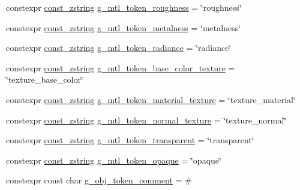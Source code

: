 \begin{DoxyCompactItemize}
constexpr \mbox{\hyperlink{namespacemage_abfd9206dc607ceb5d13ec68bf075a5c0}{const\+\_\+zstring}} \mbox{\hyperlink{namespacemage_1_1rendering_1_1loader_a2ec32e8ddd043f1989ca6b58ad964c32}{g\+\_\+mtl\+\_\+token\+\_\+roughness}} = \char`\"{}roughness\char`\"{}
\item 
constexpr \mbox{\hyperlink{namespacemage_abfd9206dc607ceb5d13ec68bf075a5c0}{const\+\_\+zstring}} \mbox{\hyperlink{namespacemage_1_1rendering_1_1loader_a17bfd9071437318629c792d38ca71808}{g\+\_\+mtl\+\_\+token\+\_\+metalness}} = \char`\"{}metalness\char`\"{}
\item 
constexpr \mbox{\hyperlink{namespacemage_abfd9206dc607ceb5d13ec68bf075a5c0}{const\+\_\+zstring}} \mbox{\hyperlink{namespacemage_1_1rendering_1_1loader_a5abd3a154bef9be04f7649447c50164a}{g\+\_\+mtl\+\_\+token\+\_\+radiance}} = \char`\"{}radiance\char`\"{}
\item 
constexpr \mbox{\hyperlink{namespacemage_abfd9206dc607ceb5d13ec68bf075a5c0}{const\+\_\+zstring}} \mbox{\hyperlink{namespacemage_1_1rendering_1_1loader_aa3dfb00f93883473d1ff397f0079364e}{g\+\_\+mtl\+\_\+token\+\_\+base\+\_\+color\+\_\+texture}} = \char`\"{}texture\+\_\+base\+\_\+color\char`\"{}
\item 
constexpr \mbox{\hyperlink{namespacemage_abfd9206dc607ceb5d13ec68bf075a5c0}{const\+\_\+zstring}} \mbox{\hyperlink{namespacemage_1_1rendering_1_1loader_a0bd068f0f246c00b56412b1bd7f70ed4}{g\+\_\+mtl\+\_\+token\+\_\+material\+\_\+texture}} = \char`\"{}texture\+\_\+material\char`\"{}
\item 
constexpr \mbox{\hyperlink{namespacemage_abfd9206dc607ceb5d13ec68bf075a5c0}{const\+\_\+zstring}} \mbox{\hyperlink{namespacemage_1_1rendering_1_1loader_afa917f0393f16f0fec40ad5d85aa65f9}{g\+\_\+mtl\+\_\+token\+\_\+normal\+\_\+texture}} = \char`\"{}texture\+\_\+normal\char`\"{}
\item 
constexpr \mbox{\hyperlink{namespacemage_abfd9206dc607ceb5d13ec68bf075a5c0}{const\+\_\+zstring}} \mbox{\hyperlink{namespacemage_1_1rendering_1_1loader_a2e86bdf00ab5d9721684b02b575a9df7}{g\+\_\+mtl\+\_\+token\+\_\+transparent}} = \char`\"{}transparent\char`\"{}
\item 
constexpr \mbox{\hyperlink{namespacemage_abfd9206dc607ceb5d13ec68bf075a5c0}{const\+\_\+zstring}} \mbox{\hyperlink{namespacemage_1_1rendering_1_1loader_a6f5ffd9bd3336fb8589c59a322ca2b1e}{g\+\_\+mtl\+\_\+token\+\_\+opaque}} = \char`\"{}opaque\char`\"{}
\item 
constexpr const char \mbox{\hyperlink{namespacemage_1_1rendering_1_1loader_a28d2091ac0bc8a30979e417ca93adfb9}{g\+\_\+obj\+\_\+token\+\_\+comment}} = \textquotesingle{}\#\textquotesingle{}

\end{DoxyCompactItemize}
